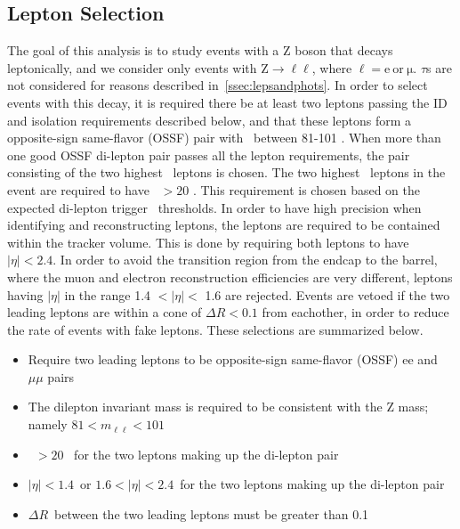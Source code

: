 \subsection{Lepton Selection}
\label{ssec:lepsel}
The goal of this analysis is to study events with a Z boson that decays leptonically,
and we consider only events with Z$\rightarrow\ell\ell$, where $\mathrm{\ell=e~or~\mu}$.
$\tau$s are not considered for reasons described in~\ref{ssec:lepsandphots}.
In order to select events with this decay,
it is required there be at least two leptons passing the ID and isolation requirements described below,
and that these leptons form a opposite-sign same-flavor (OSSF) pair with \mll\ between 81-101 \gev.
When more than one good OSSF di-lepton pair passes all the lepton requirements,
the pair consisting of the two highest \pt\ leptons is chosen.
The two highest \pt\ leptons in the event are required to have \pt\ $> 20$ \gev.
This requirement is chosen based on the expected di-lepton trigger \pt\ thresholds.
In order to have high precision when identifying and reconstructing leptons,
the leptons are required to be contained within the tracker volume.
This is done by requiring both leptons to have $|\eta| < 2.4$.
In order to avoid the transition region from the endcap to the barrel, 
where the muon and electron reconstruction efficiencies are very different, 
leptons having $|\eta|$ in the range 1.4 $< |\eta| <$ 1.6 are rejected.
Events are vetoed if the two leading leptons are within a cone of $\Delta R < 0.1$ from eachother,
in order to reduce the rate of events with fake leptons.
These selections are summarized below.

\begin{itemize}
\item Require two leading leptons to be opposite-sign same-flavor (OSSF) ee and $\mu\mu$ pairs
\item The dilepton invariant mass is required to be consistent with the Z mass; namely $81<m_{\ell\ell}<101$~\gev
\item \pt\ $> 20$ \gev\ for the two leptons making up the di-lepton pair
\item $|\eta| < 1.4$~or $1.6 < |\eta| < 2.4$~for the two leptons making up the di-lepton pair
\item $\Delta R$~between the two leading leptons must be greater than 0.1
\end{itemize}


